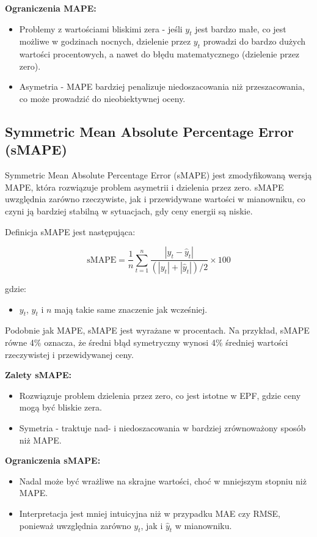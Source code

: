 \textbf{Ograniczenia MAPE:}
\begin{itemize}
    \item Problemy z wartościami bliskimi zera - jeśli \( y_t \) jest bardzo małe, co jest możliwe w godzinach nocnych, dzielenie przez \( y_t \) prowadzi do bardzo dużych wartości procentowych, a nawet do błędu matematycznego (dzielenie przez zero).
    \item Asymetria - MAPE bardziej penalizuje niedoszacowania niż przeszacowania, co może prowadzić do nieobiektywnej oceny.
\end{itemize}

\subsection{Symmetric Mean Absolute Percentage Error (sMAPE)}
\label{subsec:smape}

Symmetric Mean Absolute Percentage Error (sMAPE) jest zmodyfikowaną wersją MAPE, która rozwiązuje problem asymetrii i dzielenia przez zero. sMAPE uwzględnia zarówno rzeczywiste, jak i przewidywane wartości w mianowniku, co czyni ją bardziej stabilną w sytuacjach, gdy ceny energii są niskie.

Definicja sMAPE jest następująca:

\[
\text{sMAPE} = \frac{1}{n} \sum_{t=1}^{n} \frac{\left| y_t - \hat{y}_t \right|}{\left( \left| y_t \right| + \left| \hat{y}_t \right| \right) / 2} \times 100
\]

gdzie:
\begin{itemize}
    \item \( y_t \), \( \hat{y}_t \) i \( n \) mają takie same znaczenie jak wcześniej.
\end{itemize}

Podobnie jak MAPE, sMAPE jest wyrażane w procentach. Na przykład, sMAPE równe 4\% oznacza, że średni błąd symetryczny wynosi 4\% średniej wartości rzeczywistej i przewidywanej ceny.

\textbf{Zalety sMAPE:}
\begin{itemize}
    \item Rozwiązuje problem dzielenia przez zero, co jest istotne w EPF, gdzie ceny mogą być bliskie zera.
    \item Symetria - traktuje nad- i niedoszacowania w bardziej zrównoważony sposób niż MAPE.
\end{itemize}

\textbf{Ograniczenia sMAPE:}
\begin{itemize}
    \item Nadal może być wrażliwe na skrajne wartości, choć w mniejszym stopniu niż MAPE.
    \item Interpretacja jest mniej intuicyjna niż w przypadku MAE czy RMSE, ponieważ uwzględnia zarówno \( y_t \), jak i \( \hat{y}_t \) w mianowniku.
\end{itemize}

